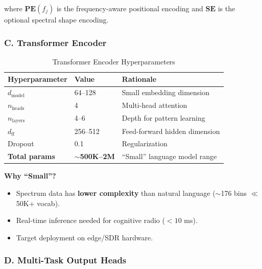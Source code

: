 \documentclass[12pt, a4paper]{article}
\begin{document}
where $\mathbf{PE}(f_j)$ is the frequency-aware positional encoding and $\mathbf{SE}$ is the optional spectral shape encoding.


\subsubsection{C. Transformer Encoder}

\begin{table}[H]
\centering
\caption{Transformer Encoder Hyperparameters}
\label{tab:hyperparams}
\begin{tabular}{@{}llp{6cm}@{}}
\toprule
\textbf{Hyperparameter} & \textbf{Value}   & \textbf{Rationale} \\
\midrule
$d_\text{model}$    & 64--128  & Small embedding dimension \\
$n_\text{heads}$    & 4        & Multi-head attention \\
$n_\text{layers}$   & 4--6     & Depth for pattern learning \\
$d_\text{ff}$       & 256--512 & Feed-forward hidden dimension \\
Dropout              & 0.1      & Regularization \\
\textbf{Total params} & \textbf{$\sim$500K--2M} & ``Small'' language model range \\
\bottomrule
\end{tabular}
\end{table}

\textbf{Why ``Small''?}
\begin{itemize}[leftmargin=1.5em]
    \item Spectrum data has \textbf{lower complexity} than natural language ($\sim$176 bins $\ll$ 50K+ vocab).
    \item Real-time inference needed for cognitive radio ($< 10$ ms).
    \item Target deployment on edge/SDR hardware.
\end{itemize}


\subsubsection{D. Multi-Task Output Heads}
\end{document}
